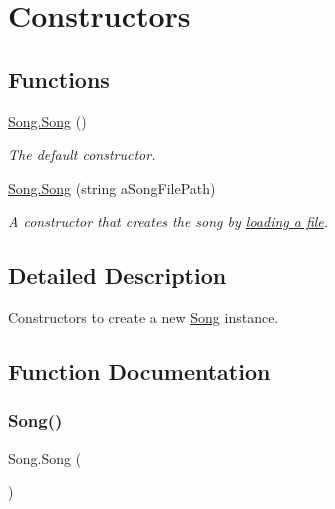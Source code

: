 \hypertarget{group___song_construct}{}\section{Constructors}
\label{group___song_construct}
\subsection*{Functions}
\begin{DoxyCompactItemize}
\item 
\hyperlink{group___song_construct_gae2e6486a6a2f523b7c81de472d761ff5}{Song.\+Song} ()
\begin{DoxyCompactList}\small\item\em The default constructor. \end{DoxyCompactList}\item 
\hyperlink{group___song_construct_ga157b9e8a0ca714707c2bf58bed5ebf4c}{Song.\+Song} (string a\+Song\+File\+Path)
\begin{DoxyCompactList}\small\item\em A constructor that creates the song by \hyperlink{group___song_priv_func_ga5c8edd8f7ebeab0d93f5619a644c30f5}{loading a file}. \end{DoxyCompactList}\end{DoxyCompactItemize}


\subsection{Detailed Description}
Constructors to create a new \hyperlink{class_song}{Song} instance. 

\subsection{Function Documentation}
\mbox{\label{group___song_construct_gae2e6486a6a2f523b7c81de472d761ff5}} 
\subsubsection{\texorpdfstring{Song()}{Song()}\hspace{0.1cm}{\footnotesize\ttfamily [1/2]}}
{\footnotesize\ttfamily Song.\+Song (\begin{DoxyParamCaption}{ }\end{DoxyParamCaption})}



